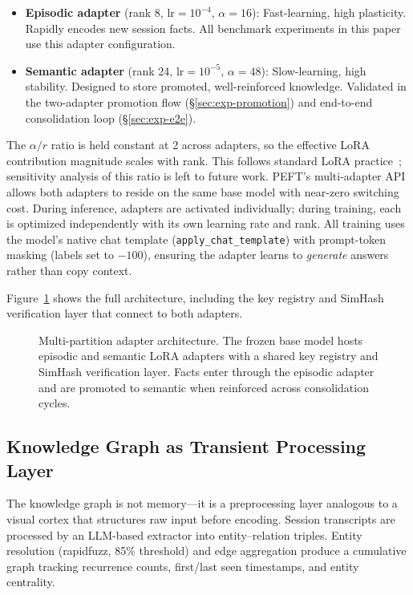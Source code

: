 \documentclass[11pt]{article}
\begin{document}
\begin{itemize}
    \item \textbf{Episodic adapter} (rank 8, $\text{lr}=10^{-4}$, $\alpha=16$): Fast-learning, high plasticity. Rapidly encodes new session facts. All benchmark experiments in this paper use this adapter configuration.
    \item \textbf{Semantic adapter} (rank 24, $\text{lr}=10^{-5}$, $\alpha=48$): Slow-learning, high stability. Designed to store promoted, well-reinforced knowledge. Validated in the two-adapter promotion flow (\S\ref{sec:exp-promotion}) and end-to-end consolidation loop (\S\ref{sec:exp-e2e}).
\end{itemize}

The $\alpha/r$ ratio is held constant at 2 across adapters, so the effective LoRA contribution magnitude scales with rank.
This follows standard LoRA practice~\citep{hu2022lora}; sensitivity analysis of this ratio is left to future work.
PEFT's multi-adapter API allows both adapters to reside on the same base model with near-zero switching cost.
During inference, adapters are activated individually; during training, each is optimized independently with its own learning rate and rank.
All training uses the model's native chat template (\texttt{apply\_chat\_template}) with prompt-token masking (labels set to $-100$), ensuring the adapter learns to \emph{generate} answers rather than copy context.

Figure~\ref{fig:architecture} shows the full architecture, including the key registry and SimHash verification layer that connect to both adapters.

\begin{figure}[t]
    \centering
    
    \caption{Multi-partition adapter architecture. The frozen base model hosts episodic and semantic LoRA adapters with a shared key registry and SimHash verification layer. Facts enter through the episodic adapter and are promoted to semantic when reinforced across consolidation cycles.}
    \label{fig:architecture}
\end{figure}

\subsection{Knowledge Graph as Transient Processing Layer}
\label{sec:graph}

The knowledge graph is not memory---it is a preprocessing layer analogous to a visual cortex that structures raw input before encoding.
Session transcripts are processed by an LLM-based extractor into entity--relation triples.
Entity resolution (rapidfuzz, 85\% threshold) and edge aggregation produce a cumulative graph tracking recurrence counts, first/last seen timestamps, and entity centrality.
\end{document}
